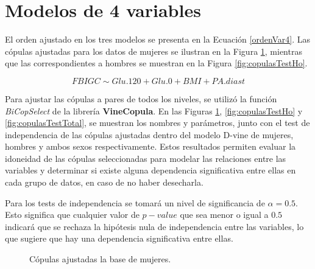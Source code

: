 
\section{Modelos de 4 variables}

El orden ajustado en los tres modelos se presenta en la Ecuación \eqref{ordenVar4}. Las cópulas ajustadas para los datos de mujeres se ilustran en la Figura \ref{fig:copulasTestMu}, mientras que las correspondientes a hombres se muestran en la Figura \ref{fig:copulasTestHo}.

\begin{equation}\label{ordenVar4}
     FBIGC \sim Glu.120 + Glu.0 + BMI + PA.diast
\end{equation}

Para ajustar las cópulas a pares de todos los niveles, se utilizó la función \textit{BiCopSelect} de la librería \textbf{VineCopula}. En las Figuras  \ref{fig:copulasTestMu}, \ref{fig:copulasTestHo} y \ref{fig:copulasTestTotal}, se muestran los nombres y parámetros, junto con el test de independencia de las cópulas ajustadas dentro del modelo D-vine de mujeres, hombres y ambos sexos respectivamente. Estos resultados permiten evaluar la idoneidad de las cópulas seleccionadas para modelar las relaciones entre las variables y determinar si existe alguna dependencia significativa entre ellas en cada grupo de datos, en caso de no haber desecharla. 

Para los tests de independencia se tomará un nivel de significancia de $\alpha = 0.5$. Esto significa que cualquier valor de $p-value$ que sea menor o igual a $0.5$ indicará que se rechaza la hipótesis nula de independencia entre las variables, lo que sugiere que hay una dependencia significativa entre ellas.

\begin{figure}[H]
 \centering
    \caption{Cópulas ajustadas la base de mujeres.}
    \label{fig:copulasTestMu}
\end{figure}

